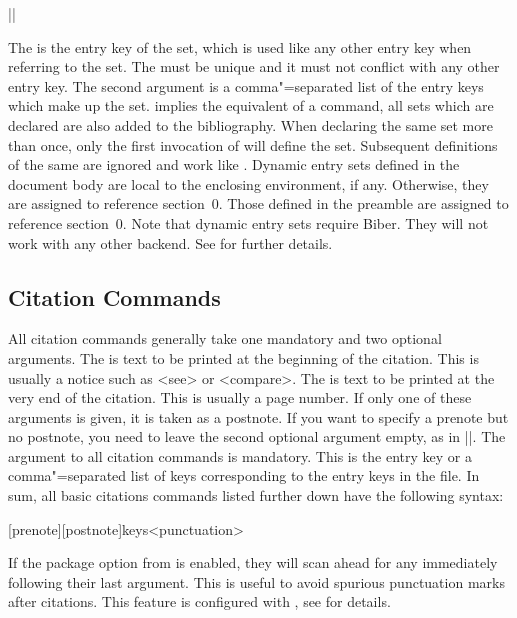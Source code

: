 \documentclass{ltxdockit}[2011/03/25]
\newcommand*{\biber}{Biber\xspace}
\begin{document}
\begin{ltxsyntax}

|\BiberOnlyMark|

The  is the entry key of the set, which is used like any other entry key when referring to the set. The  must be unique and it must not conflict with any other entry key. The second argument is a comma"=separated list of the entry keys which make up the set.  implies the equivalent of a  command, \ie all sets which are declared are also added to the bibliography. When declaring the same set more than once, only the first invocation of  will define the set. Subsequent definitions of the same  are ignored and work like . Dynamic entry sets defined in the document body are local to the enclosing  environment, if any. Otherwise, they are assigned to reference section~0. Those defined in the preamble are assigned to reference section~0. Note that dynamic entry sets require \biber. They will not work with any other backend. See  for further details.

\end{ltxsyntax}

\subsection{Citation Commands}
\label{use:cit}

All citation commands generally take one mandatory and two optional arguments. The  is text to be printed at the beginning of the citation. This is usually a notice such as <see> or <compare>. The  is text to be printed at the very end of the citation. This is usually a page number. If only one of these arguments is given, it is taken as a postnote. If you want to specify a prenote but no postnote, you need to leave the second optional argument empty, as in |\cite[see][]{key}|. The  argument to all citation commands is mandatory. This is the entry key or a comma"=separated list of keys corresponding to the entry keys in the  file. In sum, all basic citations commands listed further down have the following syntax:

\begin{ltxsyntax}

[prenote][postnote]{keys}<punctuation>

If the  package option from  is enabled, they will scan ahead for any  immediately following their last argument. This is useful to avoid spurious punctuation marks after citations. This feature is configured with , see  for details.

\end{ltxsyntax}
\end{document}
